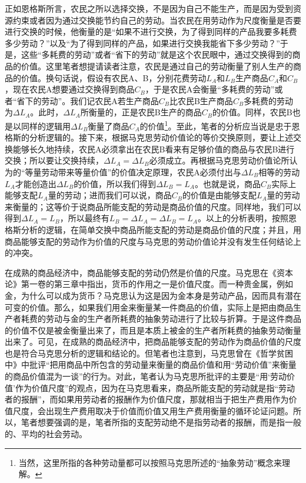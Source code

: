 正如恩格斯所言，农民之所以选择交换，不是因为自己不能生产，而是因为受到资源约束或者因为通过交换能节约自己的劳动。当农民在用劳动作为尺度衡量是否要进行交换的时候，他衡量的是“如果不进行交换，为了得到同样的产品我要多耗费多少劳动？”以及“为了得到同样的产品，如果进行交换我能省下多少劳动？”于是，这些“多耗费的劳动”或者“省下的劳动”就是这个农民眼中，通过交换得到的商品的价值。这里笔者想提请读者注意，农民是通过自己的劳动衡量了别人生产的商品的价值。换句话说，假设有农民A、B，分别花费劳动$L_A$和$L_B$生产商品$C_A$和$C_B$，现在农民A想要通过交换得到商品$C_B$，于是农民A会衡量“多耗费的劳动”或者“省下的劳动”。我们记农民A若生产商品$C_B$比农民B生产商品$C_B$多耗费的劳动为$\Delta L_A$。此时，$\Delta L_A$所衡量的，正是农民B生产的商品$C_B$的价值。同样，农民B也是以同样的逻辑用$\Delta L_B$衡量了商品$C_A$的价值\footnote{当然，这里所指的各种劳动量都可以按照马克思所述的“抽象劳动”概念来理解。}。至此，笔者的分析应当说是忠于恩格斯的分析逻辑的。接下来，根据马克思劳动价值论的等价交换原则，要让上述交换能够长久地持续，农民A必须拿出在农民B看来有足够价值的商品与农民B进行交换；所以要让交换持续，$\Delta L_A = \Delta L_B$必须成立。再根据马克思劳动价值论所认为的“等量劳动带来等量价值”的价值决定原理，农民A必须付出与$\Delta L_B$相等的劳动$L_A$才能创造出$\Delta L_B$的价值，所以我们得到$\Delta L_B = L_A$。也就是说，商品$C_B$实际上能够支配$L_A$量的劳动；进而我们可以说，商品$C_B$的价值是由能够支配$L_A$量的劳动来衡量的；这等价于说商品所能支配的劳动是商品价值的尺度。同样地，我们可以得到$\Delta L_A = L_B$，所以最终有$L_B =\Delta L_A = \Delta L_B = L_A$。以上的分析表明，按照恩格斯分析的逻辑，在简单交换中商品所能支配的劳动是商品价值的尺度；并且，用商品能够支配的劳动作为价值的尺度与马克思的劳动价值论并没有发生任何结论上的冲突。

在成熟的商品经济中，商品能够支配的劳动仍然是价值的尺度。马克思在《资本论》第一卷的第三章中指出，货币的作用之一是价值尺度\cite[114-124]{ZhongGongZhongYangMaKeSiEnGeSiLieNingSiDaLinZhuZuoBianYiJuMaKeSiEnGeSiWenJiDi5Juan2009}。而一种贵金属，例如金，为什么可以成为货币？马克思认为这是因为金本身是劳动产品，因而具有潜在可变的价值\cite[118]{ZhongGongZhongYangMaKeSiEnGeSiLieNingSiDaLinZhuZuoBianYiJuMaKeSiEnGeSiWenJiDi5Juan2009}。那么，如果我们用金来衡量某一件商品的价值，实际上是把由商品生产者耗费的劳动与金的生产者所耗费的抽象劳动进行了比较与折算。于是这件商品的价值不仅是被金衡量出来了，而且是本质上被金的生产者所耗费的抽象劳动衡量出来了。可见，在成熟的商品经济中，把商品能够支配的劳动作为商品价值的尺度也是符合马克思分析的逻辑和结论的。但笔者也注意到，马克思曾在《哲学贫困中》中批评“把用商品中所包含的劳动量来衡量的商品价值和用“劳动价值”来衡量的商品价值混为一谈”的行为\cite[97]{ZhongGongZhongYangMaKeSiEnGeSiLieNingSiDaLinZhuZuoBianYiJuMaKeSiEnGeSiQuanJiDi4Juan1958}。对此，笔者认为马克思所批评的主要是“用‘劳动价值’作为价值尺度”的观点，因为在马克思看来，商品所能支配的劳动就是指“劳动者的报酬”，而如果用劳动者的报酬作为价值尺度，那就相当于把生产费用作为价值尺度，会出现生产费用取决于价值而价值又用生产费用衡量的循环论证问题\cite[98]{ZhongGongZhongYangMaKeSiEnGeSiLieNingSiDaLinZhuZuoBianYiJuMaKeSiEnGeSiQuanJiDi4Juan1958}。\cite[5]{ZhangLeiShengMaKeSiLaoDongJieZhiLunYanJiuDeLiShiZhengTiXing2015}所以，笔者想要强调的是，笔者所指的支配劳动绝不是指劳动者的报酬，而是指一般的、平均的社会劳动。

